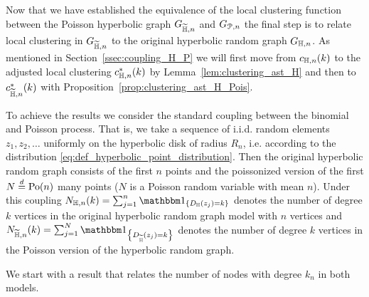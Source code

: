 Now that we have established the equivalence of the local clustering function between the Poisson hyperbolic graph $G_{\widetilde{\mathbb{H}},n}$ and $G_{{\mathcal P},n}$ the final step is to relate local clustering in $G_{\widetilde{\mathbb{H}},n}$ to the original hyperbolic random graph $G_{\mathbb{H},n}$. As mentioned in Section~\ref{ssec:coupling_H_P} we will first move from $c_{\mathbb{H},n}(k)$ to the adjusted local clustering $c_{\mathbb{H},n}^\ast(k)$ by Lemma~\ref{lem:clustering_ast_H} and then to $c_{\widetilde{\mathbb{H}},n}^\ast(k)$ with Proposition~\ref{prop:clustering_ast_H_Pois}.

To achieve the results we consider the standard coupling between the binomial and Poisson process. That is, we take a sequence of i.i.d. random elements $z_1, z_2, \dots$ uniformly on the hyperbolic disk of radius $R_n$, i.e. according to the distribution \eqref{eq:def_hyperbolic_point_distribution}. Then the original hyperbolic random graph consists of the first $n$ points and the poissonized version of the first $N \stackrel{d}{=} {\mathrm{Po}}(n)$ many points ($N$ is a Poisson random variable with mean $n$). Under this coupling $N_{\H,n}(k) = \sum_{j=1}^n \ind{D_\H(z_j)=k}$ denotes the number of degree $k$ vertices in the original hyperbolic random graph model with $n$ vertices and $N_{\HP,n}(k)=\sum_{j=1}^{N} \ind{D_{\HP}(z_j)=k}$ denotes the number of degree $k$ vertices in the Poisson version of the hyperbolic random graph.

We start with a result that relates the number of nodes with degree $k_n$ in both models. 

